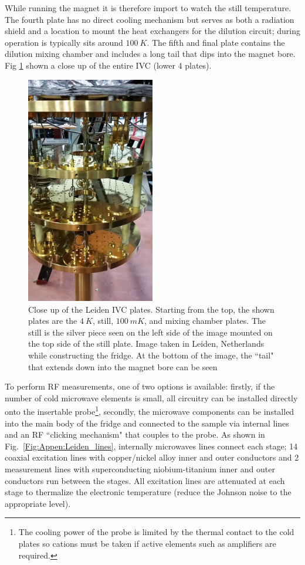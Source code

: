  While running the magnet it is therefore import to watch the still temperature. The fourth plate has no direct cooling mechanism but serves as both a radiation shield and a location to mount the heat exchangers for the dilution circuit; during operation is typically sits around $100~K$. The fifth and final plate contains the dilution mixing chamber and includes a long tail that dips into the magnet bore. Fig \ref{Fig:Appen:Leiden_Full} shown a close up of the entire IVC (lower 4 plates).

\begin{figure}
\centering
\includegraphics[width = 0.5\textwidth]{figures/appendix/cryostats/Leiden_full.jpg}
\caption{Close up of the Leiden IVC plates. Starting from the top, the shown plates are the $4~K$, still, $100~mK$, and mixing chamber plates. The still is the silver piece seen on the left side of the image mounted on the top side of the still plate. Image taken in Leiden, Netherlands while constructing the fridge. At the bottom of the image, the ``tail" that extends down into the magnet bore can be seen}
\label{Fig:Appen:Leiden_Full}
\end{figure}

To perform RF measurements, one of two options is available: firstly, if the number of cold microwave elements is small, all circuitry can be installed directly onto the insertable probe\footnote{The cooling power of the probe is limited by the thermal contact to the cold plates so cations must be taken if active elements such as amplifiers are required.}, secondly, the microwave components can be installed into the main body of the fridge and connected to the sample via internal lines and an RF ``clicking mechanism" that couples to the probe. As shown in Fig.~\ref{Fig:Appen:Leiden_lines}, internally microwaves lines connect each stage; 14 coaxial excitation lines with copper/nickel alloy inner and outer conductors and 2 measurement lines with superconducting niobium-titanium inner and outer conductors run between the stages. All excitation lines are attenuated at each stage to thermalize the electronic temperature (reduce the Johnson noise to the appropriate level).

